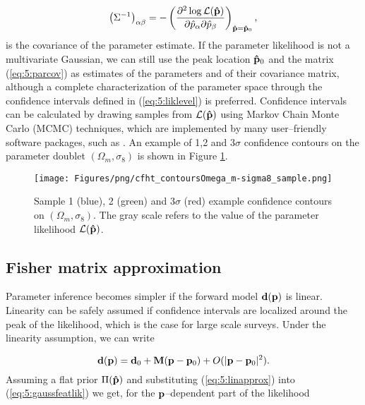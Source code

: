 \begin{equation}
\label{eq:5:parcov}
\left(\Sigma^{-1}\right)_{\alpha\beta} = -\left(\frac{\partial^2\log\mathcal{L}(\mathbf{\hat{p}})}{\partial\hat{p}_\alpha\partial\hat{p}_\beta}\right)_{\mathbf{\hat{p}}=\mathbf{\hat{p}}_0},
\end{equation}
%
is the covariance of the parameter estimate. If the parameter likelihood is not a multivariate Gaussian, we can still use the peak location $\mathbf{\hat{p}}_0$ and the matrix (\ref{eq:5:parcov}) as estimates of the parameters and of their covariance matrix, although a complete characterization of the parameter space through the confidence intervals defined in (\ref{eq:5:liklevel}) is preferred. Confidence intervals can be calculated by drawing samples from $\mathcal{L}(\mathbf{\hat{p}})$ using Markov Chain Monte Carlo (MCMC) techniques, which are implemented by many user--friendly software packages, such as  \citep{emcee}. An example of 1,2 and 3$\sigma$ confidence contours on the parameter doublet $(\Omega_m,\sigma_8)$ is shown in Figure \ref{fig:5:contsample}.

\begin{figure}
\begin{center}
\texttt{[image: Figures/png/cfht\_contoursOmega\_m-sigma8\_sample.png]}
\end{center}
\caption{Sample 1 (blue), 2 (green) and 3$\sigma$ (red) example confidence contours on $(\Omega_m,\sigma_8)$. The gray scale refers to the value of the parameter likelihood $\mathcal{L}(\mathbf{\hat{p}})$.}
\label{fig:5:contsample}
\end{figure}

\subsection{Fisher matrix approximation}
\label{sec:5:fisher}
Parameter inference becomes simpler if the forward model $\mathbf{d}(\mathbf{p})$ is linear. Linearity can be safely assumed if confidence intervals are localized around the peak of the likelihood, which is the case for large scale surveys. Under the linearity assumption, we can write 

\begin{equation}
\label{eq:5:linapprox}
\mathbf{d}(\mathbf{p}) = \mathbf{d}_0 + \mathbf{M}(\mathbf{p}-\mathbf{p}_0) + O(\vert\mathbf{p}-\mathbf{p}_0\vert^2).
\end{equation}          
%
Assuming a flat prior $\Pi(\mathbf{\hat{p}})$ and substituting (\ref{eq:5:linapprox}) into (\ref{eq:5:gaussfeatlik}) we get, for the $\mathbf{p}$--dependent part of the likelihood

